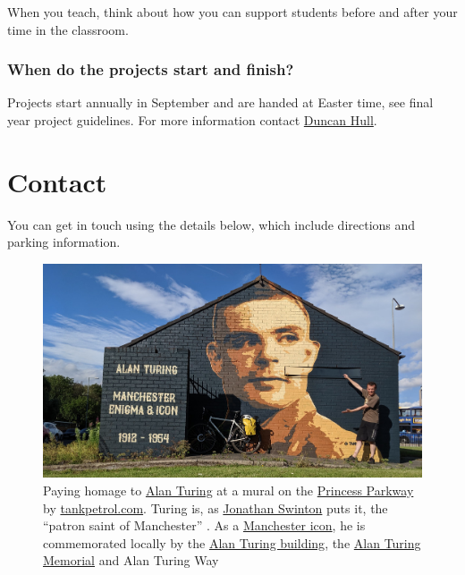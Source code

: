 \documentclass[
  12pt,
]{book}
\begin{document}
When you teach, think about how you can support students before and after your time in the classroom.

\hypertarget{finishing}{%
\subsection{When do the projects start and finish?}\label{finishing}}

Projects start annually in September and are handed at Easter time, see final year project guidelines. For more information contact \protect\hyperlink{Contact}{Duncan Hull}.

\hypertarget{contact}{%
\chapter{Contact}\label{contact}}

You can get in touch using the details below, which include directions and parking information.



\begin{figure}

{\centering \includegraphics[width=1\linewidth]{images/turingicon} 

}

\caption{Paying homage to \href{https://en.wikipedia.org/wiki/Alan_Turing}{Alan Turing} at a mural on the \href{https://en.wikipedia.org/wiki/A5103_road}{Princess Parkway} by \href{http://tankpetrol.com/}{tankpetrol.com}. Turing is, as \href{https://www.manturing.net/jonathan}{Jonathan Swinton} puts it, the ``patron saint of Manchester'' \citep{manturing}. As a \href{https://en.wikipedia.org/wiki/Symbols_of_Manchester}{Manchester icon}, he is commemorated locally by the \href{https://en.wikipedia.org/wiki/Alan_Turing_Building}{Alan Turing building}, the \href{https://en.wikipedia.org/wiki/Alan_Turing_Memorial}{Alan Turing Memorial} and Alan Turing Way \citep{turingway}}\label{fig:unnamed-chunk-9}
\end{figure}
\end{document}
